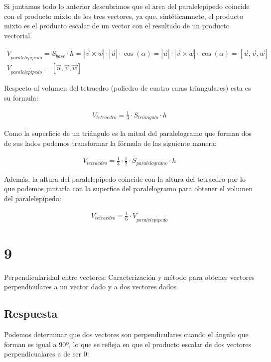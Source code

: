 \documentclass[
	12pt, %
	spanish, %
]{fphw}
\newcommand{\vu}{\vec{u}}
\newcommand{\vv}{\vec{v}}
\newcommand{\vw}{\vec{w}}
\begin{document}
Si juntamos todo lo anterior descubrimos que el area del paralelepipedo coincide con el producto mixto de los tres vectores, ya que, sintéticamnete, el producto mixto es el producto escalar de un vector con el resultado de un producto vectorial.

\begin{gather*}
	V_{paralelep\acute{i}pedo} = S_{base} \cdot h = |\vv \times \vw| \cdot |\vu| \cdot \cos(\alpha) = |\vu| \cdot|\vv \times \vw| \cdot \cos(\alpha)=[\vu,\vv,\vw]\\
	V_{paralelep\acute{i}pedo} = [\vu,\vv,\vw]
\end{gather*}


Respecto al volumen del tetraedro (poliedro de cuatro caras triangulares) esta es su formula:

\begin{gather*}
	V_{tetraedro} = \frac{1}{3} \cdot S_{tri\acute{a}ngulo} \cdot h
\end{gather*}

Como la superficie de un triángulo es la mitad del paralelogramo que forman dos de sus lados podemos transformar la fórmula de las siguiente manera: 

\begin{gather*}
	V_{tetraedro} = \frac{1}{3} \cdot \frac{1}{2} \cdot S_{paralelogramo} \cdot h
\end{gather*}

Además, la altura del paralelepipedo coincide con la altura del tetraedro por lo que podemos juntarla con la superfice del paralelogramo para obtener el  volumen del paralelepípedo:

\begin{gather*}
	V_{tetraedro} = \frac{1}{6} \cdot V_{paralelep\acute{i}pedo} 
\end{gather*}


\section*{9}

\begin{problem}
	Perpendicularidad entre vectores: Caracterización y método para obtener
vectores perpendiculares a un vector dado y a dos vectores dados
\end{problem}

\subsection*{Respuesta} Podemos determinar que dos vectores son perpendiculares cuando el ángulo que forman es igual a 90º, lo que se refleja en que el producto escalar de dos vectores perpendicualares a de ser 0:
\end{document}
